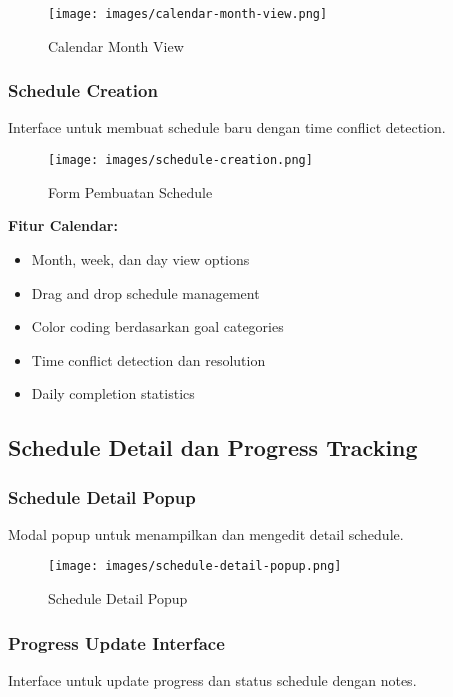 \begin{figure}[H]
\centering
\texttt{[image: images/calendar-month-view.png]}
\caption{Calendar Month View}
\label{fig:calendar-month}
\end{figure}

\subsubsection{Schedule Creation}
Interface untuk membuat schedule baru dengan time conflict detection.

\begin{figure}[H]
\centering
\texttt{[image: images/schedule-creation.png]}
\caption{Form Pembuatan Schedule}
\label{fig:schedule-creation}
\end{figure}

\textbf{Fitur Calendar:}
\begin{itemize}
\item Month, week, dan day view options
\item Drag and drop schedule management
\item Color coding berdasarkan goal categories
\item Time conflict detection dan resolution
\item Daily completion statistics
\end{itemize}

\subsection{Schedule Detail dan Progress Tracking}

\subsubsection{Schedule Detail Popup}
Modal popup untuk menampilkan dan mengedit detail schedule.

\begin{figure}[H]
\centering
\texttt{[image: images/schedule-detail-popup.png]}
\caption{Schedule Detail Popup}
\label{fig:schedule-detail}
\end{figure}

\subsubsection{Progress Update Interface}
Interface untuk update progress dan status schedule dengan notes.

